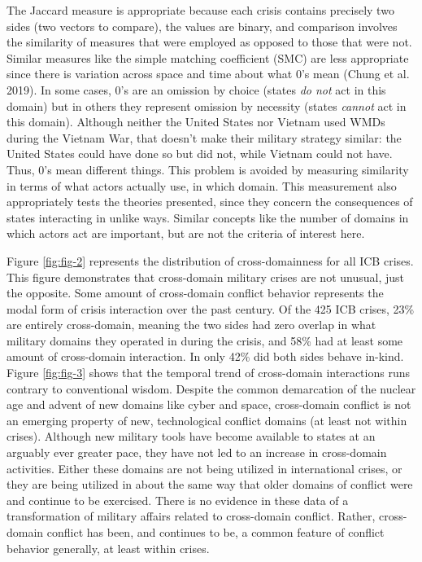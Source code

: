 \documentclass[
]{article}
\begin{document}
The Jaccard measure is appropriate because each crisis contains precisely two sides (two vectors to compare), the values are binary, and comparison involves the similarity of measures that were employed as opposed to those that were not. Similar measures like the simple matching coefficient (SMC) are less appropriate since there is variation across space and time about what 0's mean (Chung et al. 2019). In some cases, 0's are an omission by choice (states \textit{do not} act in this domain) but in others they represent omission by necessity (states \textit{cannot} act in this domain). Although neither the United States nor Vietnam used WMDs during the Vietnam War, that doesn't make their military strategy similar: the United States could have done so but did not, while Vietnam could not have. Thus, 0's mean different things. This problem is avoided by measuring similarity in terms of what actors actually use, in which domain. This measurement also appropriately tests the theories presented, since they concern the consequences of states interacting in unlike ways. Similar concepts like the number of domains in which actors act are important, but are not the criteria of interest here.

Figure \ref{fig:fig-2} represents the distribution of cross-domainness for all ICB crises. This figure demonstrates that cross-domain military crises are not unusual, just the opposite. Some amount of cross-domain conflict behavior represents the modal form of crisis interaction over the past century. Of the 425 ICB crises, 23\% are entirely cross-domain, meaning the two sides had zero overlap in what military domains they operated in during the crisis, and 58\% had at least some amount of cross-domain interaction. In only 42\% did both sides behave in-kind. Figure \ref{fig:fig-3} shows that the temporal trend of cross-domain interactions runs contrary to conventional wisdom. Despite the common demarcation of the nuclear age and advent of new domains like cyber and space, cross-domain conflict is not an emerging property of new, technological conflict domains (at least not within crises). Although new military tools have become available to states at an arguably ever greater pace, they have not led to an increase in cross-domain activities. Either these domains are not being utilized in international crises, or they are being utilized in about the same way that older domains of conflict were and continue to be exercised. There is no evidence in these data of a transformation of military affairs related to cross-domain conflict. Rather, cross-domain conflict has been, and continues to be, a common feature of conflict behavior generally, at least within crises.
\end{document}
